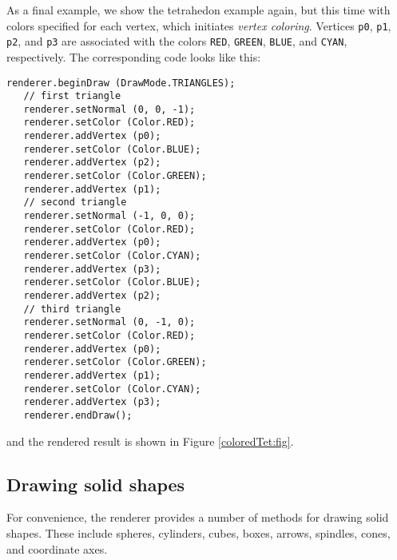 As a final example, we show the tetrahedon example again, but this
time with colors specified for each vertex, which initiates {\it
vertex coloring}.  Vertices {\tt p0}, {\tt p1}, {\tt p2}, and {\tt p3}
are associated with the colors {\tt RED}, {\tt GREEN}, {\tt BLUE}, and
{\tt CYAN}, respectively. The corresponding code looks like this:
%
\begin{lstlisting}[]
   renderer.beginDraw (DrawMode.TRIANGLES);
   // first triangle
   renderer.setNormal (0, 0, -1);
   renderer.setColor (Color.RED);
   renderer.addVertex (p0); 
   renderer.setColor (Color.BLUE);
   renderer.addVertex (p2);
   renderer.setColor (Color.GREEN);
   renderer.addVertex (p1);
   // second triangle
   renderer.setNormal (-1, 0, 0);
   renderer.setColor (Color.RED);
   renderer.addVertex (p0); 
   renderer.setColor (Color.CYAN);
   renderer.addVertex (p3);
   renderer.setColor (Color.BLUE);
   renderer.addVertex (p2);
   // third triangle
   renderer.setNormal (0, -1, 0);
   renderer.setColor (Color.RED);
   renderer.addVertex (p0);
   renderer.setColor (Color.GREEN);
   renderer.addVertex (p1);
   renderer.setColor (Color.CYAN);
   renderer.addVertex (p3);
   renderer.endDraw();
\end{lstlisting}
%
and the rendered result is shown in Figure \ref{coloredTet:fig}.

\subsection{Drawing solid shapes}

For convenience, the renderer provides a number of methods for drawing
solid shapes. These include spheres, cylinders, cubes, boxes, arrows,
spindles, cones, and coordinate axes.

